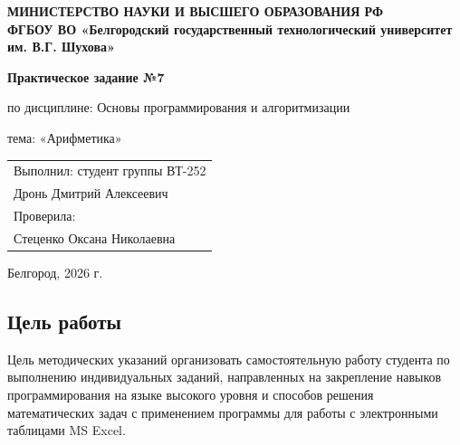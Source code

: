 \documentclass[a4paper,12pt]{article}
\begin{document}
\begin{titlepage}
    \centering
    {\bfseries МИНИСТЕРСТВО НАУКИ И ВЫСШЕГО ОБРАЗОВАНИЯ РФ \\
    ФГБОУ ВО «Белгородский государственный технологический университет им. В.Г. Шухова»\par}
    
    \vfill
    
    {\bfseries\Large Практическое задание №7\par}
    \vspace{0.5cm}
    {\large по дисциплине: Основы программирования и алгоритмизации \par}
    {\large тема: «Арифметика» \par}
    
    \vfill
    
    \begin{flushright}
    \begin{tabular}{l}
        \large Выполнил: студент группы ВТ-252 \\
        \large Дронь Дмитрий Алексеевич \\
        \large Проверила: \\
        \large Стеценко Оксана Николаевна
    \end{tabular}
    \end{flushright}
    
    \vfill
    
    {\large Белгород, 2026 г. \par}
\end{titlepage}

\newpage
\begin{center}
\section*{Цель работы}
\end{center}
Цель методических указаний организовать самостоятельную работу студента по выполнению индивидуальных заданий, направленных на закрепление навыков программирования на языке высокого уровня и способов решения математических задач с применением программы для работы с электронными таблицами MS Excel.
\newpage
\end{document}
